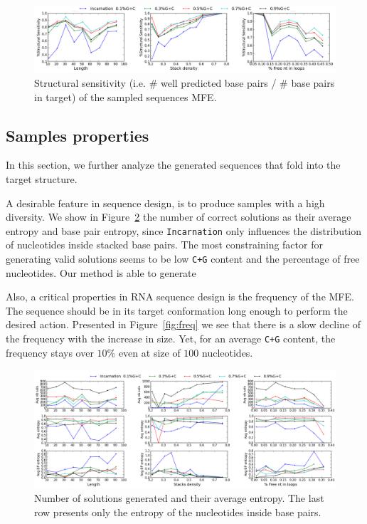 \begin{figure}[ht!]
 	\centering
	\includegraphics[scale=0.45]{Figures/rnastrand_clustered_rnainverse_100samples_struct_sens.png}
	\caption{Structural sensitivity (i.e. $\#$ well predicted base pairs / $\#$ base pairs in target) of the sampled sequences MFE. }
	\label{fig:ss_sens}	
\end{figure}


\subsection{Samples properties}

In this section, we further analyze the generated sequences that fold into the 
target structure. 

A desirable feature in sequence design, is to produce samples with a high
diversity. We show in Figure~\ref{fig:nb_sols_entropy} the number of correct
solutions as their average entropy and base pair entropy, since 
\texttt{Incarnation}  only influences the distribution of nucleotides inside 
stacked base pairs. The most constraining factor for generating valid
 solutions seems to be  low \texttt{C+G} content and the percentage of free nucleotides. Our method is able to generate 

Also, a critical properties in RNA sequence design is 
the frequency of the MFE. 
The sequence should be in its target conformation long enough to
perform the desired action. Presented in Figure~\ref{fig:freq} we see that
there is a slow decline of the frequency with the increase in size. Yet,
for an average \texttt{C+G} content, the frequency stays over $10\%$ even
at size of $100$ nucleotides.


\begin{figure}[ht!]
	\centering
	\includegraphics[width=\textwidth]{Figures/nb_sols_entropy.png}
	\caption{Number of solutions generated and their average entropy. 
	The last row presents only the entropy of the nucleotides inside base 
	pairs.}
	\label{fig:nb_sols_entropy}
\end{figure}



